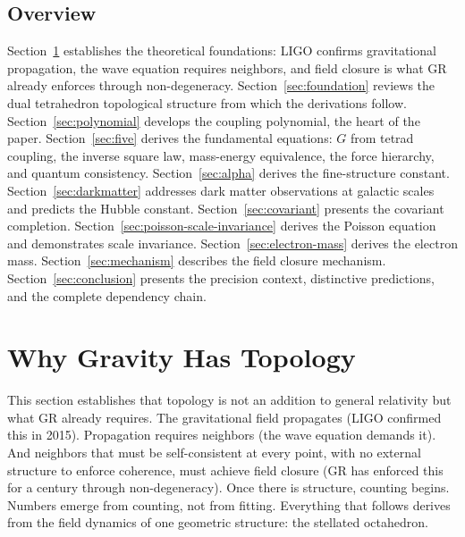 \documentclass[aps,prd,preprint,superscriptaddress,showpacs,preprintnumbers,amsmath,amssymb,nofootinbib]{revtex4-2}
\begin{document}
\subsection{Overview}
\label{subsec:structure}

Section~\ref{sec:theory} establishes the theoretical foundations: LIGO confirms gravitational propagation, the wave equation requires neighbors, and field closure is what GR already enforces through non-degeneracy. Section~\ref{sec:foundation} reviews the dual tetrahedron topological structure from which the derivations follow. Section~\ref{sec:polynomial} develops the coupling polynomial, the heart of the paper. Section~\ref{sec:five} derives the fundamental equations: $G$ from tetrad coupling, the inverse square law, mass-energy equivalence, the force hierarchy, and quantum consistency. Section~\ref{sec:alpha} derives the fine-structure constant. Section~\ref{sec:darkmatter} addresses dark matter observations at galactic scales and predicts the Hubble constant. Section~\ref{sec:covariant} presents the covariant completion. Section~\ref{sec:poisson-scale-invariance} derives the Poisson equation and demonstrates scale invariance. Section~\ref{sec:electron-mass} derives the electron mass. Section~\ref{sec:mechanism} describes the field closure mechanism. Section~\ref{sec:conclusion} presents the precision context, distinctive predictions, and the complete dependency chain.

\section{Why Gravity Has Topology}
\label{sec:theory}

This section establishes that topology is not an addition to general relativity but what GR already requires. The gravitational field propagates (LIGO confirmed this in 2015). Propagation requires neighbors (the wave equation demands it). And neighbors that must be self-consistent at every point, with no external structure to enforce coherence, must achieve field closure (GR has enforced this for a century through non-degeneracy). Once there is structure, counting begins. Numbers emerge from counting, not from fitting. Everything that follows derives from the field dynamics of one geometric structure: the stellated octahedron.
\end{document}
